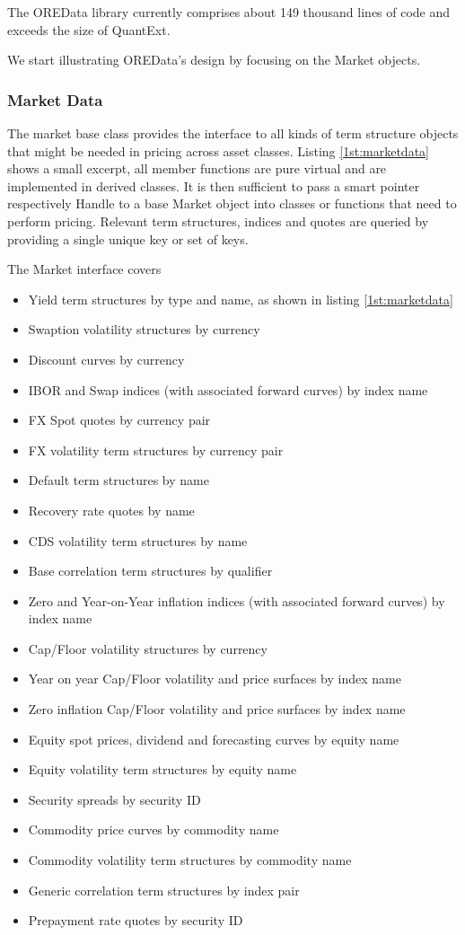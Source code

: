 \documentclass[12pt, a4paper]{report}
\begin{document}
The OREData library currently comprises about 149 thousand lines of code and exceeds the size of QuantExt.

We start illustrating OREData's design by focusing on the Market objects.

\subsubsection{Market Data}\label{sec:marketdata}
The market base class provides the interface to all kinds of term structure objects that might be needed in pricing across asset classes. Listing \ref{1st:marketdata} shows a small excerpt, all member functions are pure virtual and are implemented in derived classes. It is then
sufficient to pass a smart pointer respectively Handle to a base Market object into classes or functions that need to perform pricing. Relevant term structures, indices and quotes are queried by providing a single unique key or set of keys.

The Market interface covers
\begin{itemize}
\item Yield term structures by type and name, as shown in listing \ref{1st:marketdata}
\item Swaption volatility structures by currency
\item Discount curves by currency
\item IBOR and Swap indices (with associated forward curves) by index name
\item FX Spot quotes by currency pair
\item FX volatility term structures by currency pair
\item Default term structures by name
\item Recovery rate quotes by name
\item CDS volatility term structures by name
\item Base correlation term structures by qualifier
\item Zero and Year-on-Year inflation indices (with associated forward curves) by index name
\item Cap/Floor volatility structures by currency
\item Year on year Cap/Floor volatility and price surfaces by index name
\item Zero inflation Cap/Floor volatility and price surfaces by index name
\item Equity spot prices, dividend and forecasting curves by equity name
\item Equity volatility term structures by equity name
\item Security spreads by security ID
\item Commodity price curves by commodity name
\item Commodity volatility term structures by commodity name
\item Generic correlation term structures by index pair
\item Prepayment rate quotes by security ID
\end{itemize}
\end{document}
